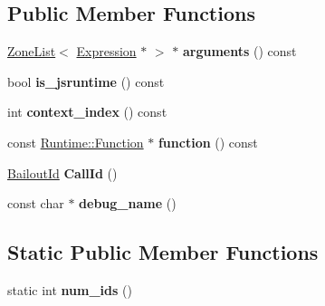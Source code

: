 \subsection*{Public Member Functions}
\begin{DoxyCompactItemize}
\item 
\hyperlink{classv8_1_1internal_1_1_zone_list}{Zone\+List}$<$ \hyperlink{classv8_1_1internal_1_1_expression}{Expression} $\ast$ $>$ $\ast$ {\bfseries arguments} () const \hypertarget{classv8_1_1internal_1_1_call_runtime_a4ec3bd8c0a586c9dc66ea60652ed28ca}{}\label{classv8_1_1internal_1_1_call_runtime_a4ec3bd8c0a586c9dc66ea60652ed28ca}

\item 
bool {\bfseries is\+\_\+jsruntime} () const \hypertarget{classv8_1_1internal_1_1_call_runtime_a7b8723453c5d36584baaaecdf5dcf677}{}\label{classv8_1_1internal_1_1_call_runtime_a7b8723453c5d36584baaaecdf5dcf677}

\item 
int {\bfseries context\+\_\+index} () const \hypertarget{classv8_1_1internal_1_1_call_runtime_aa4220af2be5ee653473667d1be1f17d0}{}\label{classv8_1_1internal_1_1_call_runtime_aa4220af2be5ee653473667d1be1f17d0}

\item 
const \hyperlink{structv8_1_1internal_1_1_runtime_1_1_function}{Runtime\+::\+Function} $\ast$ {\bfseries function} () const \hypertarget{classv8_1_1internal_1_1_call_runtime_a2e541d8f50db6eb56f0e686bff6dc70d}{}\label{classv8_1_1internal_1_1_call_runtime_a2e541d8f50db6eb56f0e686bff6dc70d}

\item 
\hyperlink{classv8_1_1internal_1_1_bailout_id}{Bailout\+Id} {\bfseries Call\+Id} ()\hypertarget{classv8_1_1internal_1_1_call_runtime_a6e388b652b3cc5316da11f53f3da78fd}{}\label{classv8_1_1internal_1_1_call_runtime_a6e388b652b3cc5316da11f53f3da78fd}

\item 
const char $\ast$ {\bfseries debug\+\_\+name} ()\hypertarget{classv8_1_1internal_1_1_call_runtime_a00159ea8b5532f8002e36e158c54bf31}{}\label{classv8_1_1internal_1_1_call_runtime_a00159ea8b5532f8002e36e158c54bf31}

\end{DoxyCompactItemize}
\subsection*{Static Public Member Functions}
\begin{DoxyCompactItemize}
\item 
static int {\bfseries num\+\_\+ids} ()\hypertarget{classv8_1_1internal_1_1_call_runtime_a207eec6cdd0ad1959415efe577739c82}{}\label{classv8_1_1internal_1_1_call_runtime_a207eec6cdd0ad1959415efe577739c82}

\end{DoxyCompactItemize}
